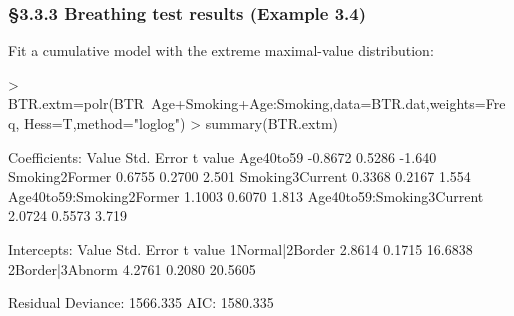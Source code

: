 \documentclass{beamer}
\begin{document}
\begin{frame}[fragile] \frametitle{\S3.3.3 Breathing test results  (Example 3.4)}
Fit a cumulative model with the extreme maximal-value distribution:
\begin{scriptsize}
\begin{Schunk}
\begin{Sinput}
> BTR.extm=polr(BTR~Age+Smoking+Age:Smoking,data=BTR.dat,weights=Freq, 
                              Hess=T,method="loglog")
> summary(BTR.extm)
\end{Sinput} 
\begin{Soutput}
Coefficients:
                            Value Std. Error t value
Age40to59                 -0.8672     0.5286  -1.640
Smoking2Former             0.6755     0.2700   2.501
Smoking3Current            0.3368     0.2167   1.554
Age40to59:Smoking2Former   1.1003     0.6070   1.813
Age40to59:Smoking3Current  2.0724     0.5573   3.719

Intercepts:
                Value   Std. Error t value
1Normal|2Border  2.8614  0.1715    16.6838
2Border|3Abnorm  4.2761  0.2080    20.5605

Residual Deviance: 1566.335 
AIC: 1580.335 
\end{Soutput}
\end{Schunk}
\end{scriptsize}
\end{frame}
\end{document}

